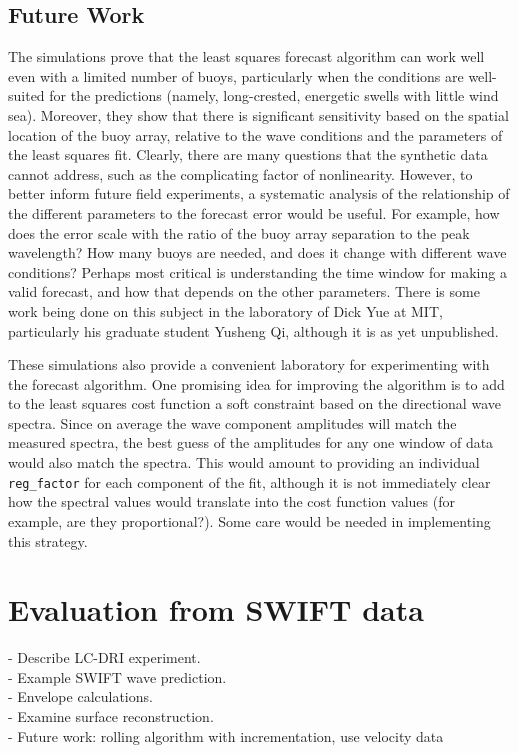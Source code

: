 \documentclass[11pt]{article}
\begin{document}
\subsection{Future Work}

The simulations prove that the least squares forecast algorithm can work well even with a limited number of buoys, particularly when the conditions are well-suited for the predictions (namely, long-crested, energetic swells with little wind sea).  Moreover, they show that there is significant sensitivity based on the spatial location of the buoy array, relative to the wave conditions and the parameters of the least squares fit.  Clearly, there are many questions that the synthetic data cannot address, such as the complicating factor of nonlinearity.  However, to better inform future field experiments, a systematic analysis of the relationship of the different parameters to the forecast error would be useful.  For example, how does the error scale with the ratio of the buoy array separation to the peak wavelength?  How many buoys are needed, and does it change with different wave conditions?  Perhaps most critical is understanding the time window for making a valid forecast, and how that depends on the other parameters.  There is some work being done on this subject in the laboratory of Dick Yue at MIT, particularly his graduate student Yusheng Qi, although it is as yet unpublished.

These simulations also provide a convenient laboratory for experimenting with the forecast algorithm.  One promising idea for improving the algorithm is to add to the least squares cost function a soft constraint based on the directional wave spectra.  Since on average the wave component amplitudes will match the measured spectra, the best guess of the amplitudes for any one window of data would also match the spectra.  This would amount to providing an individual \texttt{reg\_factor} for each component of the fit, although it is not immediately clear how the spectral values would translate into the cost function values (for example, are they proportional?).  Some care would be needed in implementing this strategy.

\section{Evaluation from SWIFT data}
- Describe LC-DRI experiment.\\
- Example SWIFT wave prediction.\\
- Envelope calculations.\\
- Examine surface reconstruction.\\
- Future work: rolling algorithm with incrementation, use velocity data\\
\end{document}
